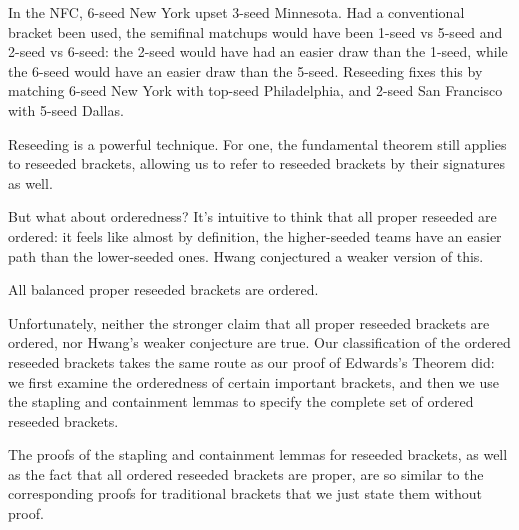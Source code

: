 {

In the NFC, 6-seed New York upset 3-seed Minnesota. Had a conventional bracket been used, the semifinal matchups would have been 1-seed vs 5-seed and 2-seed vs 6-seed: the 2-seed would have had an easier draw than the 1-seed, while the 6-seed would have an easier draw than the 5-seed. Reseeding fixes this by matching 6-seed New York with top-seed Philadelphia, and 2-seed San Francisco with 5-seed Dallas.

Reseeding is a powerful technique. For one, the fundamental theorem still applies to reseeded brackets, allowing us to refer to reseeded brackets by their signatures as well.


But what about orderedness? It's intuitive to think that all proper reseeded are ordered: it feels like almost by definition, the higher-seeded teams have an easier path than the lower-seeded ones. Hwang \cite{reseeding} conjectured a weaker version of this.

\begin{conj}{}{}
    All balanced proper reseeded brackets are ordered.
\end{conj}

Unfortunately, neither the stronger claim that all proper reseeded brackets are ordered, nor Hwang's weaker conjecture are true. Our classification of the ordered reseeded brackets takes the same route as our proof of Edwards's Theorem did: we first examine the orderedness of certain important brackets, and then we use the stapling and containment lemmas to specify the complete set of ordered reseeded brackets.

The proofs of the stapling and containment lemmas for reseeded brackets, as well as the fact that all ordered reseeded brackets are proper, are so similar to the corresponding proofs for traditional brackets that we just state them without proof. 

}
